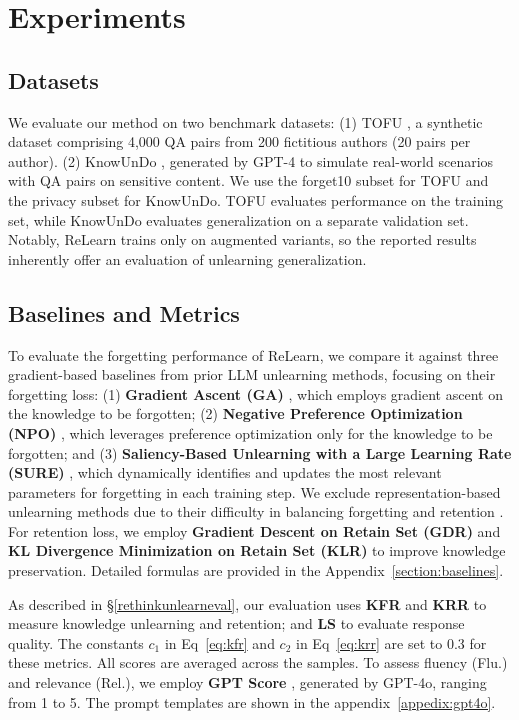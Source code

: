 \section{Experiments}
\label{section:experiments}

\subsection{Datasets}
We evaluate our method on two benchmark datasets:
(1) TOFU \citep{maini2024tofutaskfictitiousunlearning}, a synthetic dataset comprising 4,000 QA pairs from 200 fictitious authors (20 pairs per author). 
(2) KnowUnDo \citep{tian2024forgetnotpracticalknowledge}, generated by GPT-4 to simulate real-world scenarios with QA pairs on sensitive content.
We use the forget10 subset for TOFU and the privacy subset for KnowUnDo.
TOFU evaluates performance on the training set, while KnowUnDo evaluates generalization on a separate validation set. 
Notably, ReLearn trains only on augmented variants, so the reported results inherently offer an evaluation of unlearning generalization.

\subsection{Baselines and Metrics}
\label{sec:baselines_metrics}
To evaluate the forgetting performance of ReLearn, we compare it against three gradient-based baselines from prior LLM unlearning methods, focusing on their forgetting loss:
(1) \textbf{Gradient Ascent (GA)} \citep{ga}, which employs gradient ascent on the knowledge to be forgotten;
(2) \textbf{Negative Preference Optimization (NPO)} \citep{npo}, which leverages preference optimization only for the knowledge to be forgotten; 
and (3) \textbf{Saliency-Based Unlearning with a Large Learning Rate (SURE)} \citep{zhang2024doesllmtrulyunlearn}, which dynamically identifies and updates the most relevant parameters for forgetting in each training step.
We exclude representation-based unlearning methods due to their difficulty in balancing forgetting and retention \citep{shi2024musemachineunlearningsixway}.
For retention loss, we employ \textbf{Gradient Descent on Retain Set (GDR)} and \textbf{KL Divergence Minimization on Retain Set (KLR)} to improve knowledge preservation.
Detailed formulas are provided in the Appendix~\ref{section:baselines}.

As described in \S\ref{rethinkunlearneval}, our evaluation uses \textbf{KFR} and \textbf{KRR} to measure knowledge unlearning and retention; and \textbf{LS} to evaluate response quality. 
The constants $c_1$ in Eq~\eqref{eq:kfr} and $c_2$ in Eq~\eqref{eq:krr} are set to 0.3 for these metrics. 
All scores are averaged across the samples. 
To assess fluency (Flu.) and relevance (Rel.), 
we employ \textbf{GPT Score} \citep{sottana-etal-2023-evaluation}, generated by GPT-4o, ranging from 1 to 5.
The prompt templates are shown in the appendix~\ref{appedix:gpt4o}.

